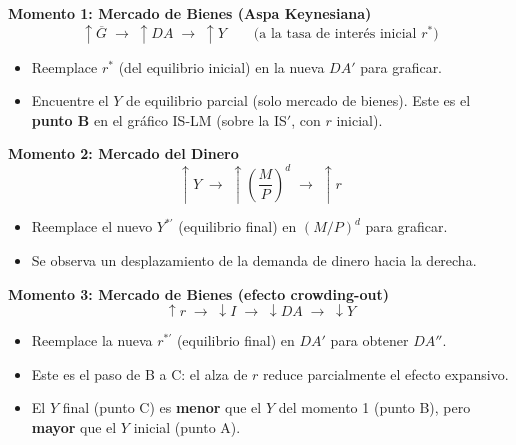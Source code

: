 \documentclass[11pt,a4paper]{article}
\newcommand{\barvar}[1]{\overline{#1}}
\begin{document}
\begin{hintbox}
\textbf{Momento 1: Mercado de Bienes (Aspa Keynesiana)}
\[
    \uparrow \barvar{G} \;\rightarrow\; \uparrow DA \;\rightarrow\; \uparrow Y \qquad \text{(a la tasa de inter\'{e}s inicial } r^* \text{)}
\]
\begin{itemize}[leftmargin=1.5em, itemsep=2pt]
    \item Reemplace $r^*$ (del equilibrio inicial) en la nueva $DA'$ para graficar.
    \item Encuentre el $Y$ de equilibrio parcial (solo mercado de bienes). Este es el \textbf{punto B} en el gr\'{a}fico IS-LM (sobre la IS$'$, con $r$ inicial).
\end{itemize}

\vspace{0.3cm}
\textbf{Momento 2: Mercado del Dinero}
\[
    \uparrow Y \;\rightarrow\; \uparrow \left(\frac{M}{P}\right)^d \;\rightarrow\; \uparrow r
\]
\begin{itemize}[leftmargin=1.5em, itemsep=2pt]
    \item Reemplace el nuevo $Y^{*\prime}$ (equilibrio final) en $(M/P)^d$ para graficar.
    \item Se observa un desplazamiento de la demanda de dinero hacia la derecha.
\end{itemize}

\vspace{0.3cm}
\textbf{Momento 3: Mercado de Bienes (efecto crowding-out)}
\[
    \uparrow r \;\rightarrow\; \downarrow I \;\rightarrow\; \downarrow DA \;\rightarrow\; \downarrow Y
\]
\begin{itemize}[leftmargin=1.5em, itemsep=2pt]
    \item Reemplace la nueva $r^{*\prime}$ (equilibrio final) en $DA'$ para obtener $DA''$.
    \item Este es el paso de B a C: el alza de $r$ reduce parcialmente el efecto expansivo.
    \item El $Y$ final (punto C) es \textbf{menor} que el $Y$ del momento 1 (punto B), pero \textbf{mayor} que el $Y$ inicial (punto A).
\end{itemize}
\end{hintbox}

\vspace{0.4cm}
\end{document}
